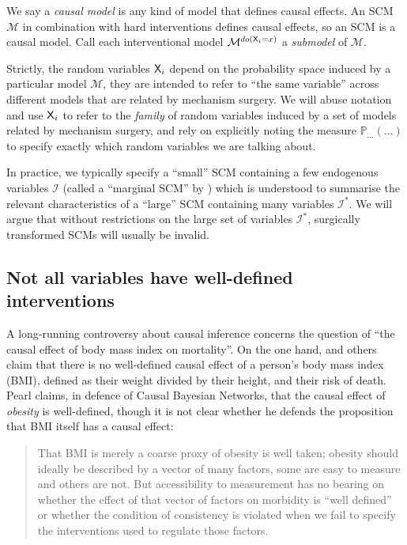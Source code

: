 We say a \emph{causal model} is any kind of model that defines causal effects. An SCM $\mathcal{M}$ in combination with hard interventions defines causal effects, so an SCM is a causal model. Call each interventional model $\mathcal{M}^{do(\mathsf{X}_i=x)}$ a \emph{submodel} of $\mathcal{M}$.

Strictly, the random variables $\mathsf{X}_i$ depend on the probability space induced by a particular model $\mathcal{M}$, they are intended to refer to ``the same variable'' across different models that are related by mechanism surgery. We will abuse notation and use $\mathsf{X}_i$ to refer to the \emph{family} of random variables induced by a set of models related by mechanism surgery, and rely on explicitly noting the measure $\mathbb{P}_{...}(...)$ to specify exactly which random variables we are talking about. 

In practice, we typically specify a ``small'' SCM containing a few endogenous variables $\mathcal{I}$ (called a ``marginal SCM'' by \citet{bongers_theoretical_2016}) which is understood to summarise the relevant characteristics of a ``large'' SCM containing many variables $\mathcal{I}^*$. We will argue that without restrictions on the large set of variables $\mathcal{I}^*$, surgically transformed SCMs will usually be invalid.


\subsection{Not all variables have well-defined interventions}

A long-running controversy about causal inference concerns the question of ``the causal effect of body mass index on mortality''. On the one hand, \citet{hernan_does_2008} and others claim that there is no well-defined causal effect of a person's body mass index (BMI), defined as their weight divided by their height, and their risk of death. Pearl claims, in defence of Causal Bayesian Networks, that the causal effect of \emph{obesity} is well-defined, though it is not clear whether he defends the proposition that BMI itself has a causal effect:

\begin{quote}
That BMI is merely a coarse proxy of obesity is well taken; obesity should ideally be described by a vector of many factors, some are easy to measure and others are not. But accessibility to measurement has no bearing on whether the effect of that vector of factors on morbidity is ``well defined'' or whether the condition of consistency is violated when we fail to specify the interventions used to regulate those factors. \citep{pearl_does_2018}
\end{quote}

